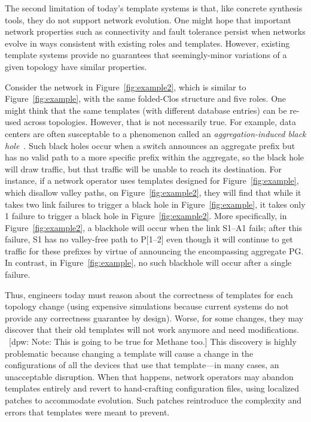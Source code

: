 \documentclass{sig-alternate-10pt}
\newcommand{\dpw}[1]{\textcolor{tmlblue}{[dpw: #1]}}
\begin{document}

The second limitation of today's template systems is that, like concrete synthesis tools, they do not support network evolution. One might hope that important network properties such as connectivity and fault tolerance persist when networks evolve in ways consistent with existing roles and templates.  However, existing 
template systems provide no guarantees that seemingly-minor variations of a given topology have similar properties.    

Consider the network in Figure~\ref{fig:example2}, which is similar to Figure~\ref{fig:example}, with the same folded-Clos structure and five roles. One might think that the same templates (with different database entries) can be re-used across topologies. However, that is not necessarily true.  For example,
data centers are often susceptable to a phenomenon called an \emph{aggregation-induced black hole}~\cite{route-aggregation}.  Such black holes occur when a switch announces an aggregate prefix but has no valid path to a more specific prefix within the aggregate, so the black hole will draw traffic, but that traffic will be unable
to reach its destination.
For instance, if a network operator uses templates designed for Figure~\ref{fig:example}, which
disallow valley paths, on Figure~\ref{fig:example2}, they will find that while it takes two link failures to
trigger a black hole in  Figure~\ref{fig:example}, it takes only 1 failure to trigger a black hole in
 Figure~\ref{fig:example2}.   
More specifically, in Figure~\ref{fig:example2}, a blackhole will occur when the link S1--A1 fails; after this failure, S1 has no valley-free path to P[1--2] even though it will continue to get traffic for these prefixes by virtue of announcing the encompassing aggregate PG. In contrast, in Figure~\ref{fig:example}, no such blackhole will occur after a single failure.

Thus, engineers today must reason about the correctness of templates for each topology change (using expensive simulations because current systems do not provide any correctness guarantee by design). Worse, for some changes, they may discover that their old templates will not work anymore and need modifications. ~\dpw{Note: This is going to be true for Methane too.}  This discovery is highly problematic because changing a template will cause a change in the configurations of all the devices that use that template---in many cases, an unacceptable disruption.  When that happens, network operators may abandon templates entirely and revert to hand-crafting configuration files, using localized patches to accommodate evolution. 
Such patches reintroduce the complexity and errors that templates were meant to prevent.
\end{document}
